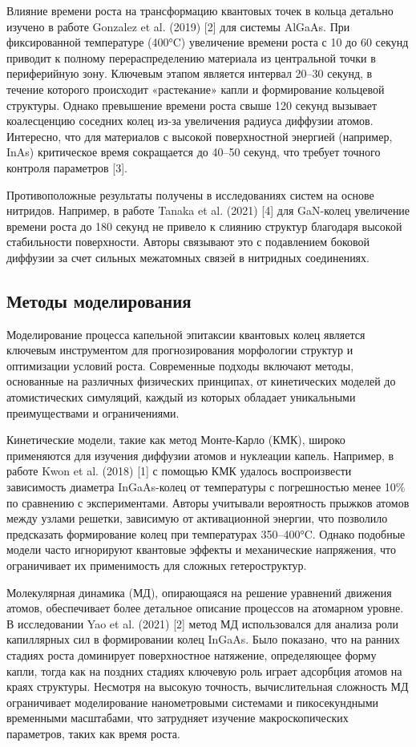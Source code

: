 \documentclass[14pt,oneside]{extarticle}
\begin{document}
Влияние времени роста на трансформацию квантовых точек в кольца детально изучено в работе Gonzalez et al. (2019) [2] для системы AlGaAs. При фиксированной температуре (400°C) увеличение времени роста с 10 до 60 секунд приводит к полному перераспределению материала из центральной точки в периферийную зону. Ключевым этапом является интервал 20–30 секунд, в течение которого происходит «растекание» капли и формирование кольцевой структуры. Однако превышение времени роста свыше 120 секунд вызывает коалесценцию соседних колец из-за увеличения радиуса диффузии атомов. Интересно, что для материалов с высокой поверхностной энергией (например, InAs) критическое время сокращается до 40–50 секунд, что требует точного контроля параметров [3].

Противоположные результаты получены в исследованиях систем на основе нитридов. Например, в работе Tanaka et al. (2021) [4] для GaN-колец увеличение времени роста до 180 секунд не привело к слиянию структур благодаря высокой стабильности поверхности. Авторы связывают это с подавлением боковой диффузии за счет сильных межатомных связей в нитридных соединениях.

\subsection{Методы моделирования}

Моделирование процесса капельной эпитаксии квантовых колец является ключевым инструментом для прогнозирования морфологии структур и оптимизации условий роста. Современные подходы включают методы, основанные на различных физических принципах, от кинетических моделей до атомистических симуляций, каждый из которых обладает уникальными преимуществами и ограничениями.

Кинетические модели, такие как метод Монте-Карло (КМК), широко применяются для изучения диффузии атомов и нуклеации капель. Например, в работе Kwon et al. (2018) [1] с помощью КМК удалось воспроизвести зависимость диаметра InGaAs-колец от температуры с погрешностью менее 10\% по сравнению с экспериментами. Авторы учитывали вероятность прыжков атомов между узлами решетки, зависимую от активационной энергии, что позволило предсказать формирование колец при температурах 350–400°C. Однако подобные модели часто игнорируют квантовые эффекты и механические напряжения, что ограничивает их применимость для сложных гетероструктур.

Молекулярная динамика (МД), опирающаяся на решение уравнений движения атомов, обеспечивает более детальное описание процессов на атомарном уровне. В исследовании Yao et al. (2021) [2] метод МД использовался для анализа роли капиллярных сил в формировании колец InGaAs. Было показано, что на ранних стадиях роста доминирует поверхностное натяжение, определяющее форму капли, тогда как на поздних стадиях ключевую роль играет адсорбция атомов на краях структуры. Несмотря на высокую точность, вычислительная сложность МД ограничивает моделирование нанометровыми системами и пикосекундными временными масштабами, что затрудняет изучение макроскопических параметров, таких как время роста.
\end{document}
